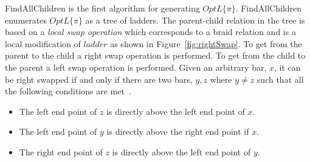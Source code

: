 {\sc FindAllChildren} is the first algorithm for generating $OptL\{\pi\}$.\newline
{\sc FindAllChildren} enumerates $OptL\{\pi\}$ as a tree of ladders.
The parent-child relation in the tree is based on a \emph{local swap operation} 
which corresponds to a braid relation and is a local modification of $ladder$ as shown in Figure~\ref{fig:rightSwap}.
To get from the parent to the child a right swap operation is performed. To get from the child to the parent 
a left swap operation is performed. 
Given an arbitrary bar, $x$, it can be right swapped if and only if there are two bars, $y,z$ where $y \neq z$ 
such that all the following conditions are met~\cite{A1}.
\begin{itemize}
	\item The left end point of $z$ is directly above the left end point of $x$.
	\item The left end point of $y$ is directly above the right end point if $x$.
	\item The right end point of $z$ is directly above the left end point of $y$.
\end{itemize}

